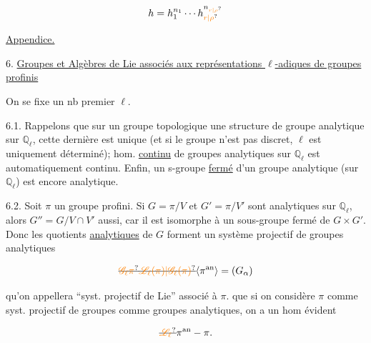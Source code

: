 \[
h=h_1^{n_1}\cdots h_{\unsure{r|\rho}}^{n_{\unsure{r|\rho}}}
\]

\uline{Appendice.}

6. \uline{Groupes et Algèbres de Lie  associés aux représentations $\ell$-adiques de groupes profinis}

On se fixe un nb premier $\ell$.

6.1. Rappelons que sur un groupe topologique  une structure de groupe analytique sur $\mathbb Q_\ell$, cette dernière est unique (et si le groupe n'est pas discret, $\ell$ est uniquement déterminé);    hom. \uline{continu} de groupes analytiques sur $\mathbb Q_\ell$ est automatiquement continu. Enfin, un s-groupe \uline{fermé} d'un groupe analytique (sur $\mathbb Q_\ell$) est encore analytique.

6.2. Soit  $\pi$ un groupe profini. Si $G=\pi/V$ et $G'=\pi/V'$ sont analytiques sur $\mathbb Q_\ell$, alors $G''=G/V\cap V'$ aussi, car il  est isomorphe à un sous-groupe fermé de $G\times G'$. Donc les  quotients \uline{analytiques} de $G$ forment un système projectif de groupes analytiques

\[
\deleted{\unsure{\mathscr G_\ell\pi}}\deleted{\unsure{\mathscr L_\ell(\pi)|\mathscr G_\ell(\pi)}}\inserted{\pi^{\mathrm{an}}}=(G_\alpha)
\]

qu'on appellera ``syst. projectif de Lie'' associé à $\pi$.  que si on considère $\pi$ comme   syst. projectif de groupes  comme groupes analytiques, on a un hom évident

\[
\deleted{\unsure{\mathscr L_\ell}}\pi^{\mathrm{an}}\mathbin{-}\pi.
\]

